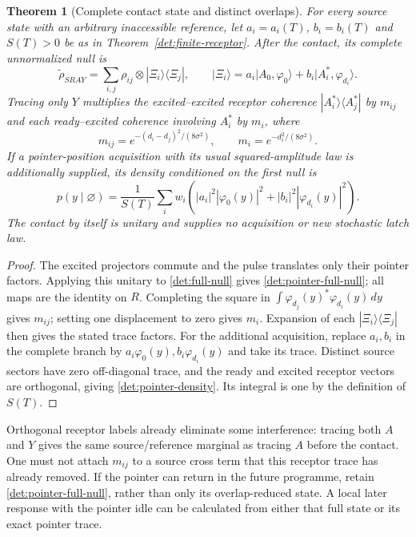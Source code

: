 \documentclass[11pt,oneside,openany]{book}
\newtheorem{theorem}{Theorem}[chapter]
\theoremstyle{definition}
\theoremstyle{remark}\newtheorem{remark}[theorem]{Remark}
\begin{document}
\begin{theorem}[Complete contact state and distinct overlaps]
\label{det:pointer-theorem}
For every source state with an arbitrary inaccessible reference, let
$a_i=a_i(T)$, $b_i=b_i(T)$ and $S(T)>0$ be as in
Theorem~\ref{det:finite-receptor}. After the contact, its complete
unnormalized null is
\begin{equation}
 \widetilde\rho_{SRAY}
 =\sum_{i,j}\rho_{ij}\otimes|\Xi_i\rangle\langle\Xi_j|,
 \qquad
 |\Xi_i\rangle=a_i|A_0,\varphi_0\rangle
                    +b_i|A_i^*,\varphi_{d_i}\rangle.
 \label{det:pointer-full-null}
\end{equation}
Tracing only $Y$ multiplies the excited--excited receptor coherence
$|A_i^*\rangle\langle A_j^*|$ by $m_{ij}$ and each
ready--excited coherence involving $A_i^*$ by $m_i$, where
\begin{equation}
 m_{ij}=e^{-(d_i-d_j)^2/(8\sigma^2)},\qquad
 m_i=e^{-d_i^2/(8\sigma^2)}.
 \label{det:pointer-overlaps}
\end{equation}
If a pointer-position acquisition with its usual squared-amplitude
law is additionally supplied, its density conditioned on the first
null is
\begin{equation}
 p(y\mid\varnothing)=\frac{1}{S(T)}\sum_iw_i
 \left(|a_i|^2|\varphi_0(y)|^2
             +|b_i|^2|\varphi_{d_i}(y)|^2\right).
 \label{det:pointer-density}
\end{equation}
The contact by itself is unitary and supplies no acquisition or
new stochastic latch law.
\end{theorem}
\begin{proof}
The excited projectors commute and the pulse translates only their
pointer factors. Applying this unitary to \eqref{det:full-null}
gives \eqref{det:pointer-full-null}; all maps are the identity on
$R$. Completing the square in
$\int\varphi_{d_j}(y)^*\varphi_{d_i}(y)\,dy$ gives $m_{ij}$;
setting one displacement to zero gives $m_i$. Expansion of each
$|\Xi_i\rangle\langle\Xi_j|$ then gives the stated trace factors.
For the additional acquisition, replace $a_i,b_i$ in the complete
branch by $a_i\varphi_0(y),b_i\varphi_{d_i}(y)$ and take its trace.
Distinct source sectors have zero off-diagonal trace, and the ready
and excited receptor vectors are orthogonal, giving
\eqref{det:pointer-density}. Its integral is one by the definition
of $S(T)$.
\end{proof}

Orthogonal receptor labels already eliminate some interference:
tracing both $A$ and $Y$ gives the same source/reference marginal as
tracing $A$ before the contact. One must not attach $m_{ij}$ to a
source cross term that this receptor trace has already removed.
If the pointer can return in the future programme, retain
\eqref{det:pointer-full-null}, rather than only its overlap-reduced
state. A local later response with the pointer idle can be calculated
from either that full state or its exact pointer trace.
\end{document}
